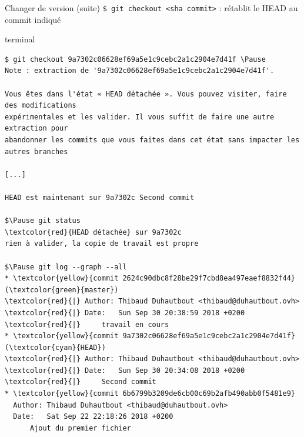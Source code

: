 \documentclass[usepdftitle=false]{beamer}
\def\seplength{.3\topsep}
\newcommand{\Pause}{%
\ifdef{\Release}
  {\pause}
  {}
}
\begin{document}
\begin{frame}[fragile]{Changer de version (suite)}
	\verb+$ git checkout <sha commit>+ : rétablit le HEAD au commit indiqué

	\begin{beamercolorbox}[rounded=true,shadow=true]{terminal}
\vspace{-\seplength}
\begin{Verbatim}
$ git checkout 9a7302c06628ef69a5e1c9cebc2a1c2904e7d41f \Pause
Note : extraction de '9a7302c06628ef69a5e1c9cebc2a1c2904e7d41f'.

Vous êtes dans l'état « HEAD détachée ». Vous pouvez visiter, faire des modifications
expérimentales et les valider. Il vous suffit de faire une autre extraction pour
abandonner les commits que vous faites dans cet état sans impacter les autres branches

[...]

HEAD est maintenant sur 9a7302c Second commit

$\Pause git status
\textcolor{red}{HEAD détachée} sur 9a7302c
rien à valider, la copie de travail est propre

$\Pause git log --graph --all
* \textcolor{yellow}{commit 2624c90dbc8f28be29f7cbd8ea497eaef8832f44} (\textcolor{green}{master})
\textcolor{red}{|} Author: Thibaud Duhautbout <thibaud@duhautbout.ovh>
\textcolor{red}{|} Date:   Sun Sep 30 20:38:59 2018 +0200
\textcolor{red}{|}     travail en cours
* \textcolor{yellow}{commit 9a7302c06628ef69a5e1c9cebc2a1c2904e7d41f} (\textcolor{cyan}{HEAD})
\textcolor{red}{|} Author: Thibaud Duhautbout <thibaud@duhautbout.ovh>
\textcolor{red}{|} Date:   Sun Sep 30 20:34:08 2018 +0200
\textcolor{red}{|}     Second commit
* \textcolor{yellow}{commit 6b6799b3209de6cb00c69b2afb490abb0f5481e9}
  Author: Thibaud Duhautbout <thibaud@duhautbout.ovh>
  Date:   Sat Sep 22 22:18:26 2018 +0200
      Ajout du premier fichier
\end{Verbatim}
	\end{beamercolorbox}
\end{frame}
\end{document}
